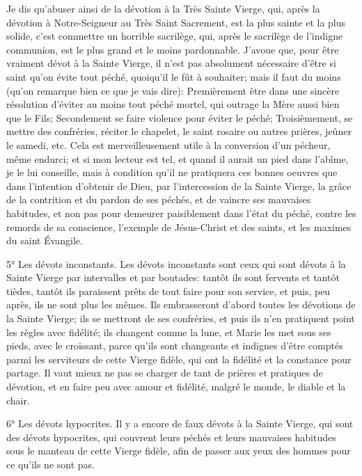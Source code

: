  Je dis qu'abuser ainsi de la dévotion à la Très Sainte Vierge, qui, après la dévotion à Notre-Seigneur au Très
Saint Sacrement, est la plus sainte et la plus solide, c'est commettre un horrible sacrilège, qui, après le sacrilège
de l'indigne communion, est le plus grand et le moins pardonnable.
J'avoue que, pour être vraiment dévot à la Sainte Vierge, il n'est pas absolument nécessaire d'être si saint qu'on
évite tout péché, quoiqu'il le fût à souhaiter; mais il faut du moins (qu'on remarque bien ce que je vais dire):
Premièrement être dans une sincère résolution d'éviter au moins tout péché mortel, qui outrage la Mère aussi bien
que le Fils;
Secondement se faire violence pour éviter le péché;
Troisièmement, se mettre des confréries, réciter le chapelet, le saint rosaire ou autres prières, jeûner le samedi,
etc.
 Cela est merveilleusement utile à la conversion d'un pécheur, même endurci; et si mon lecteur est tel, et
quand il aurait un pied dans l'abîme, je le lui conseille, mais à condition qu'il ne pratiquera ces bonnes oeuvres que
dans l'intention d'obtenir de Dieu, par l'intercession de la Sainte Vierge, la grâce de la contrition et du pardon de
ses péchés, et de vaincre ses mauvaises habitudes, et non pas pour demeurer paisiblement dans l'état du péché,
contre les remords de sa conscience, l'exemple de Jésus-Christ et des saints, et les maximes du saint Évangile.

5° Les dévots inconstants.
 Les dévots inconstants sont ceux qui sont dévots à la Sainte Vierge par intervalles et par boutades: tantôt ils
sont fervents et tantôt tièdes, tantôt ils paraissent prêts de tout faire pour son service, et puis, peu après, ils ne
sont plus les mêmes. Ils embrasseront d'abord toutes les dévotions de la Sainte Vierge; ils se mettront de ses
confréries, et puis ils n'en pratiquent point les règles avec fidélité; ils changent comme la lune, et Marie les met
sous ses pieds, avec le croissant, parce qu'ils sont changeants et indignes d'être comptés parmi les serviteurs de
cette Vierge fidèle, qui ont la fidélité et la constance pour partage. Il vaut mieux ne pas se charger de tant de
prières et pratiques de dévotion, et en faire peu avec amour et fidélité, malgré le monde, le diable et la chair.

6° Les dévots hypocrites.
 Il y a encore de faux dévots à la Sainte Vierge, qui sont des dévots hypocrites, qui couvrent leurs péchés et
leurs mauvaises habitudes sous le manteau de cette Vierge fidèle, afin de passer aux yeux des hommes pour ce
qu'ils ne sont pas.

